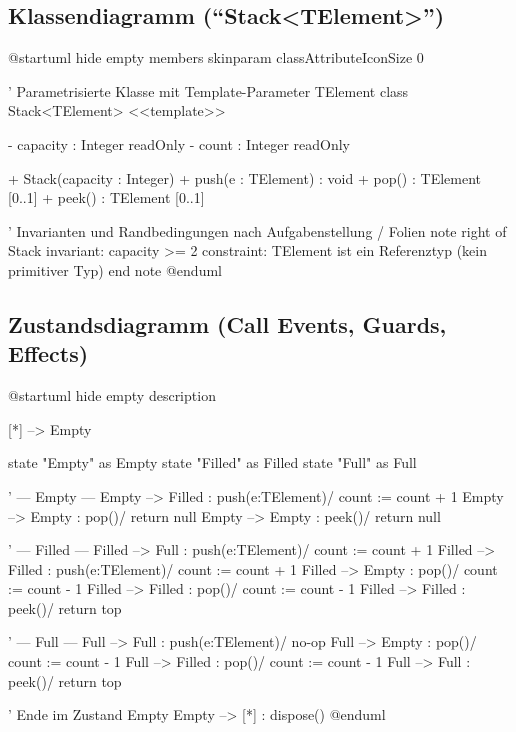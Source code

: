 \documentclass[12pt]{article}
\begin{document}
\subsection*{Klassendiagramm (\enquote{Stack<TElement>})}
\def\PlantUMLJobname{SWT-class}
\begin{plantuml}
@startuml
hide empty members
skinparam classAttributeIconSize 0

' Parametrisierte Klasse mit Template-Parameter TElement
class Stack<TElement> <<template>> {
  - capacity : Integer {readOnly}
  - count    : Integer {readOnly}

  + Stack(capacity : Integer)
  + push(e : TElement) : void
  + pop()  : TElement [0..1]
  + peek() : TElement [0..1]
}

' Invarianten und Randbedingungen nach Aufgabenstellung / Folien
note right of Stack
  {invariant: capacity >= 2}
  {constraint: TElement ist ein Referenztyp (kein primitiver Typ)}
end note
@enduml
\end{plantuml}

\subsection*{Zustandsdiagramm (Call Events, Guards, Effects)}
\def\PlantUMLJobname{SWT-states}
\begin{plantuml}
@startuml
hide empty description

[*] --> Empty

state "Empty" as Empty
state "Filled" as Filled
state "Full" as Full

' --- Empty ---
Empty --> Filled : push(e:TElement)\n/ count := count + 1
Empty --> Empty  : pop()\n[count == 0]\n/ return null
Empty --> Empty  : peek()\n[count == 0]\n/ return null

' --- Filled ---
Filled --> Full   : push(e:TElement)\n[count + 1 == capacity]\n/ count := count + 1
Filled --> Filled : push(e:TElement)\n/ count := count + 1
Filled --> Empty  : pop()\n[count - 1 == 0]\n/ count := count - 1
Filled --> Filled : pop()\n[count - 1  > 0]\n/ count := count - 1
Filled --> Filled : peek()\n[count > 0]\n/ return top

' --- Full ---
Full --> Full   : push(e:TElement)\n[count == capacity]\n/ no-op
Full --> Empty  : pop()\n[count - 1 == 0]\n/ count := count - 1
Full --> Filled : pop()\n[count - 1  > 0]\n/ count := count - 1
Full --> Full   : peek()\n[count > 0]\n/ return top

' Ende im Zustand Empty
Empty --> [*] : dispose()
@enduml
\end{plantuml}
\end{document}
